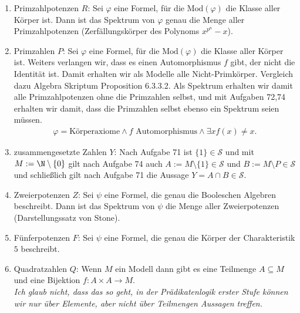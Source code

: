 \begin{solution}
\phantom{}

	\begin{enumerate}[label = \arabic*.]
		\item Primzahlpotenzen $R$: Sei $\varphi$ eine Formel, für die $\mathrm{Mod}(\varphi)$ die Klasse aller Körper ist.
		Dann ist das Spektrum von $\varphi$ genau die Menge aller Primzahlpotenzen (Zerfällungskörper des Polynoms $x^{p^n}- x$).
		\item Primzahlen $P$: Sei $\varphi$ eine Formel, für die $\mathrm{Mod}(\varphi)$ die Klasse aller Körper ist. Weiters verlangen wir, dass es einen Automorphismus $f$ gibt, der nicht
		die Identität ist. Damit erhalten wir als Modelle alle Nicht-Primkörper. Vergleich dazu Algebra Skriptum Proposition 6.3.3.2. Als Spektrum erhalten wir damit alle Primzahlpotenzen
		ohne die Primzahlen selbst, und mit Aufgaben 72,74 erhalten wir damit, dass
		die Primzahlen selbst ebenso ein Spektrum seien müssen.
		\begin{align*}
			\varphi = \text{Körperaxiome} \land f \text{ Automorphismus} \land \exists x f(x) \neq x.
		\end{align*}

		\item zusammengesetzte Zahlen $Y$: Nach Aufgabe 71 ist $\{1\} \in \mathscr{S}$ und mit $M := \N \setminus \{0\}$ gilt  nach Aufgabe 74 auch $A:= M \setminus \{1\} \in \mathscr{S}$ und $B := M \setminus P \in \mathscr{S}$ und schließlich gilt nach Aufgabe 71 die Aussage $Y = A \cap B \in \mathscr{S}$.


		\item Zweierpotenzen $Z$: Sei $\psi$ eine Formel, die genau die Booleschen Algebren beschreibt. Dann ist das Spektrum von $\psi$ die Menge aller Zweierpotenzen (Darstellungssatz von Stone).

		\item Fünferpotenzen $F$: Sei $\psi$ eine Formel, die genau die Körper der
		Charakteristik $5$ beschreibt.

		\item Quadratzahlen $Q$: Wenn $M$ ein Modell dann gibt es eine Teilmenge $A \subseteq M$ und eine Bijektion $f: A \times A \to M$. \\
		\textit{Ich glaub nicht, dass das so geht, in der Prädikatenlogik erster
		Stufe können wir nur über Elemente, aber nicht über Teilmengen Aussagen treffen.}
	\end{enumerate}

\end{solution}
